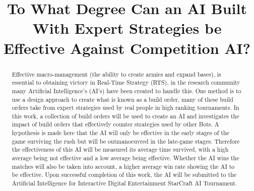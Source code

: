 \documentclass[journal]{IEEEtran}
\begin{document}
	\title{%
		To What Degree Can an AI Built With Expert Strategies be Effective Against Competition AI?} %
	
	\author{
	}
	
	
	\maketitle
	
	\begin{abstract}
		Effective macro-management (the ability to create armies and expand bases), is essential to obtaining victory in Real-Time Strategy (RTS), in the research community many Artificial Intelligence's (AI's) have been created to handle this. One method is to use a design approach to create what is known as a build order, many of these build orders take from expert strategies used by real people in high ranking tournaments. In this work, a collection of build orders will be used to create an AI and investigates the impact of build orders that effectively counter strategies used by other Bots. A hypothesis is made here that the AI will only be effective in the early stages of the game surviving the rush but will be outmanoeuvred in the late-game stages. Therefore the effectiveness of this AI will be measured its average time survived, with a high average being not effective and a low average being effective. Whether the AI wins the matches will also be taken into account, a higher average win rate showing the AI to be effective. Upon successful completion of this work, the AI will be submitted to the Artificial Intelligence for Interactive Digital Entertainment StarCraft AI Tournament.
	\end{abstract}
	
\end{document}
